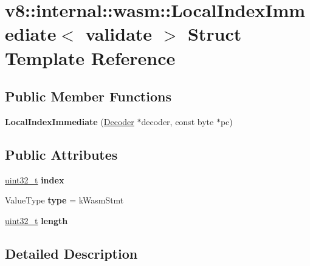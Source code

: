 \hypertarget{structv8_1_1internal_1_1wasm_1_1LocalIndexImmediate}{}\section{v8\+:\+:internal\+:\+:wasm\+:\+:Local\+Index\+Immediate$<$ validate $>$ Struct Template Reference}
\label{structv8_1_1internal_1_1wasm_1_1LocalIndexImmediate}
\subsection*{Public Member Functions}
\begin{DoxyCompactItemize}
\item 
\mbox{\label{structv8_1_1internal_1_1wasm_1_1LocalIndexImmediate_a1bbd4c24ffaf854dbdbd24baf731c737}} 
{\bfseries Local\+Index\+Immediate} (\mbox{\hyperlink{classv8_1_1internal_1_1wasm_1_1Decoder}{Decoder}} $\ast$decoder, const byte $\ast$pc)
\end{DoxyCompactItemize}
\subsection*{Public Attributes}
\begin{DoxyCompactItemize}
\item 
\mbox{\label{structv8_1_1internal_1_1wasm_1_1LocalIndexImmediate_aa81b9f7200a87b92c4d10a0250451da6}} 
\mbox{\hyperlink{classuint32__t}{uint32\+\_\+t}} {\bfseries index}
\item 
\mbox{\label{structv8_1_1internal_1_1wasm_1_1LocalIndexImmediate_aa66ddb0dea2cdfb68f2f6bea1b8a18e9}} 
Value\+Type {\bfseries type} = k\+Wasm\+Stmt
\item 
\mbox{\label{structv8_1_1internal_1_1wasm_1_1LocalIndexImmediate_a1cf51ff36be37bb85ca5bdb29760d740}} 
\mbox{\hyperlink{classuint32__t}{uint32\+\_\+t}} {\bfseries length}
\end{DoxyCompactItemize}


\subsection{Detailed Description}
